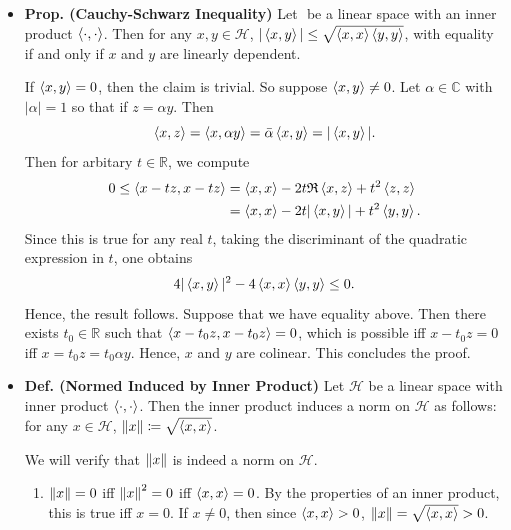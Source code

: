 \documentclass{article}
\begin{document}
\begin{itemize}
	\item \textbf{Prop. (Cauchy-Schwarz Inequality)} Let $\mathscr{}$ be a linear space with an inner product $\braket{\cdot,\cdot}$. Then for any $x, y\in \mathscr{H}$, $|\braket{x,y}| \leq \sqrt{\braket{x,x} \braket{y,y}}$, with equality if and only if $x$ and $y$ are linearly dependent. \newline 
	\begin{solutions}
		If $\braket{x,y} = 0$, then the claim is trivial. So suppose $\braket{x,y} \neq 0$. Let $\alpha \in \mathbb{C}$ with $|\alpha| = 1$ so that if $z = \alpha y$. Then 
			\begin{equation}
				\braket{x, z} = \braket{x,\alpha y} = \bar{\alpha}\braket{x,y} = |\braket{x,y}|. 
			\end{equation} 
		Then for arbitary $t \in \mathbb{R}$, we compute 
			\begin{align}
				\begin{split} 
				0 \leq \braket{x - tz, x - tz} &=\braket{x,x} -2t\mathfrak{R}\braket{x,z} + t^{2}\braket{z,z} \\				
				&= \braket{x,x} - 2t|\braket{x,y}| + t^{2}\braket{y,y}. 
				\end{split} 
			\end{align}
		Since this is true for any real $t$, taking the discriminant of the quadratic expression in $t$, one obtains 
			\begin{equation}
				4|\braket{x,y}|^{2} - 4\braket{x,x}\braket{y,y} \leq 0. 
			\end{equation}
		Hence, the result follows. Suppose that we have equality above. Then there exists $t_{0}\in \mathbb{R}$ such that $\braket{x - t_{0}z, x - t_{0}z} = 0$, which is possible iff $x - t_{0}z = 0$ iff $x = t_{0}z = t_{0}\alpha y$. Hence, $x$ and $y$ are colinear. This concludes the proof. 
	\end{solutions}
	\item \textbf{Def. (Normed Induced by Inner Product)} Let $\mathscr{H}$ be a linear space with inner product $\braket{\cdot,\cdot}$. Then the inner product induces a norm on $\mathscr{H}$ as follows: for any $x \in \mathscr{H}$, $\left\Vert x \right\Vert \coloneqq \sqrt{\braket{x,x}}$. \newline 
	\begin{solutions}
		We will verify that $\left\Vert x \right\Vert$ is indeed a norm on $\mathscr{H}$. 
			\begin{enumerate}[itemsep =-2pt,label = (\arabic{*})]
				\item $\left\Vert x \right\Vert = 0$ iff $\left\Vert x \right\Vert^{2} = 0$ iff $\braket{x, x} = 0$. By the properties of an inner product, this is true iff $x =  0$. If $x \neq 0$, then since $\braket{x,x} > 0$, $\left\Vert x \right\Vert = \sqrt{\braket{x,x}} > 0$. 

\end{enumerate}
\end{solutions}
\end{itemize}
\end{document}
